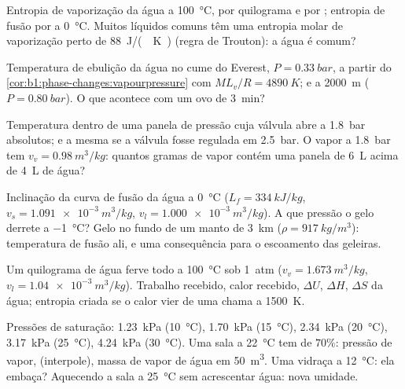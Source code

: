 \begin{exercise}[$\star$]\label{exo:b1:phase-changes:4}
Entropia de vaporização da água a \qty{100}{\degreeCelsius}, por quilograma
e por ; entropia de fusão por  a \qty{0}{\degreeCelsius}. Muitos
líquidos comuns têm uma entropia molar de vaporização perto de
\qty{88}{J/(.K)} (regra de Trouton): a água é comum?
\end{exercise}

\begin{exercise}[$\star\star$]\label{exo:b1:phase-changes:5}
Temperatura de ebulição da água no cume do Everest, $P =
\qty{0.33}{bar}$, a partir do \cref{cor:b1:phase-changes:vapourpressure} com
$ML_v/R = \qty{4890}{K}$; e a \qty{2000}{m} ($P = \qty{0.80}{bar}$). O que
acontece com um ovo de \qty{3}{min}?
\end{exercise}

\begin{exercise}[$\star\star$]\label{exo:b1:phase-changes:6}
Temperatura dentro de uma panela de pressão cuja válvula abre a \qty{1.8}{bar}
absolutos; e a mesma se a válvula fosse regulada em \qty{2.5}{bar}. O vapor a
\qty{1.8}{bar} tem $v_v = \qty{0.98}{m^3/kg}$: quantos gramas de vapor
contém uma panela de \qty{6}{L} acima de \qty{4}{L} de água?
\end{exercise}

\begin{exercise}[$\star\star$]\label{exo:b1:phase-changes:7}
Inclinação da curva de fusão da água a \qty{0}{\degreeCelsius} ($L_f =
\qty{334}{kJ/kg}$, $v_s = \qty{1.091e-3}{m^3/kg}$, $v_l = \qty{1.000e-3}{m^3/kg}$).
A que pressão o gelo derrete a \qty{-1}{\degreeCelsius}? Gelo no
fundo de um manto de \qty{3}{km} ($\rho = \qty{917}{kg/m^3}$): temperatura
de fusão ali, e uma consequência para o escoamento das geleiras.
\end{exercise}

\begin{exercise}[$\star\star$]\label{exo:b1:phase-changes:8}
Um quilograma de água ferve todo a \qty{100}{\degreeCelsius} sob
\qty{1}{atm} ($v_v = \qty{1.673}{m^3/kg}$, $v_l = \qty{1.04e-3}{m^3/kg}$).
Trabalho recebido, calor recebido, $\Delta U$, $\Delta H$, $\Delta S$ da
água; entropia criada se o calor vier de uma chama a
\qty{1500}{K}.
\end{exercise}

\begin{exercise}[$\star\star$]\label{exo:b1:phase-changes:9}
Pressões de saturação: \qty{1.23}{kPa} (\qty{10}{\degreeCelsius}), \qty{1.70}{kPa}
(\qty{15}{\degreeCelsius}), \qty{2.34}{kPa} (\qty{20}{\degreeCelsius}), \qty{3.17}{kPa}
(\qty{25}{\degreeCelsius}), \qty{4.24}{kPa} (\qty{30}{\degreeCelsius}). Uma sala
a \qty{22}{\degreeCelsius} tem  de $70\%$: pressão de
vapor,  (interpole), massa de vapor de água em
\qty{50}{m^3}. Uma vidraça a \qty{12}{\degreeCelsius}: ela embaça?
Aquecendo a sala a \qty{25}{\degreeCelsius} sem acrescentar água: nova
umidade.
\end{exercise}


